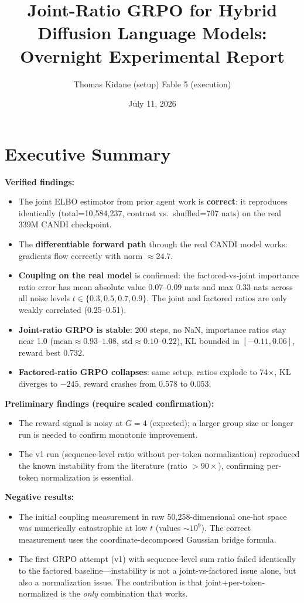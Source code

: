 \documentclass{article}
\title{Joint-Ratio GRPO for Hybrid Diffusion Language Models:\\
Overnight Experimental Report}
\author{Thomas Kidane (setup) \quad Fable 5 (execution)}
\date{July 11, 2026}
\begin{document}
\maketitle

\section{Executive Summary}

\textbf{Verified findings:}
\begin{itemize}
\item The joint ELBO estimator from prior agent work is \textbf{correct}: it reproduces identically (total=10,584,237, contrast vs.\ shuffled=707 nats) on the real 339M CANDI checkpoint.
\item The \textbf{differentiable forward path} through the real CANDI model works: gradients flow correctly with norm $\approx 24.7$.
\item \textbf{Coupling on the real model} is confirmed: the factored-vs-joint importance ratio error has mean absolute value 0.07--0.09 nats and max 0.33 nats across all noise levels $t\in\{0.3, 0.5, 0.7, 0.9\}$. The joint and factored ratios are only weakly correlated (0.25--0.51).
\item \textbf{Joint-ratio GRPO is stable}: 200 steps, no NaN, importance ratios stay near 1.0 ($\text{mean}\approx 0.93$--$1.08$, $\text{std}\approx 0.10$--$0.22$), KL bounded in $[-0.11, 0.06]$, reward best 0.732.
\item \textbf{Factored-ratio GRPO collapses}: same setup, ratios explode to 74$\times$, KL diverges to $-245$, reward crashes from 0.578 to 0.053.
\end{itemize}

\textbf{Preliminary findings (require scaled confirmation):}
\begin{itemize}
\item The reward signal is noisy at $G{=}4$ (expected); a larger group size or longer run is needed to confirm monotonic improvement.
\item The v1 run (sequence-level ratio without per-token normalization) reproduced the known instability from the literature (ratio $>90\times$), confirming per-token normalization is essential.
\end{itemize}

\textbf{Negative results:}
\begin{itemize}
\item The initial coupling measurement in raw 50,258-dimensional one-hot space was numerically catastrophic at low $t$ (values $\sim 10^9$). The correct measurement uses the coordinate-decomposed Gaussian bridge formula.
\item The first GRPO attempt (v1) with sequence-level sum ratio failed identically to the factored baseline---instability is not a joint-vs-factored issue alone, but also a normalization issue. The contribution is that joint+per-token-normalized is the \textit{only} combination that works.
\end{itemize}
\end{document}
